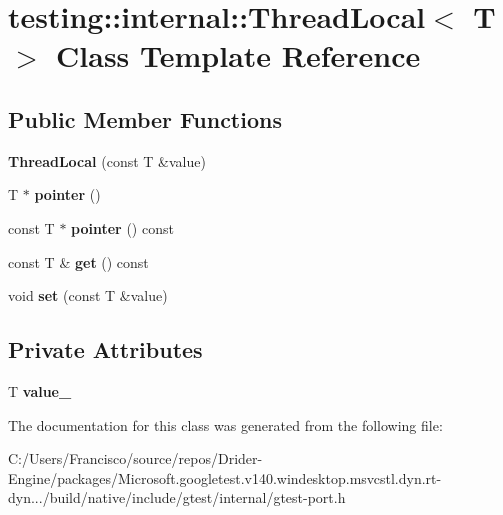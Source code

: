 \hypertarget{classtesting_1_1internal_1_1_thread_local}{}\section{testing\+:\+:internal\+:\+:Thread\+Local$<$ T $>$ Class Template Reference}
\label{classtesting_1_1internal_1_1_thread_local}
\subsection*{Public Member Functions}
\begin{DoxyCompactItemize}
\item 
\mbox{\label{classtesting_1_1internal_1_1_thread_local_a85610bdfdbc93a4c56215e0aad7da870}} 
{\bfseries Thread\+Local} (const T \&value)
\item 
\mbox{\label{classtesting_1_1internal_1_1_thread_local_a882f57fed4b074de83693c0c0fe62858}} 
T $\ast$ {\bfseries pointer} ()
\item 
\mbox{\label{classtesting_1_1internal_1_1_thread_local_a57e45bb60e3cd94abb04fa449e9f0367}} 
const T $\ast$ {\bfseries pointer} () const
\item 
\mbox{\label{classtesting_1_1internal_1_1_thread_local_ac56aeb97991824979bf192c63d1466f8}} 
const T \& {\bfseries get} () const
\item 
\mbox{\label{classtesting_1_1internal_1_1_thread_local_ab5ebc7ba07426cef7167afa2a7707eb4}} 
void {\bfseries set} (const T \&value)
\end{DoxyCompactItemize}
\subsection*{Private Attributes}
\begin{DoxyCompactItemize}
\item 
\mbox{\label{classtesting_1_1internal_1_1_thread_local_ae0db6b57bdb752feb343ee4d935708e2}} 
T {\bfseries value\+\_\+}
\end{DoxyCompactItemize}


The documentation for this class was generated from the following file\+:\begin{DoxyCompactItemize}
\item 
C\+:/\+Users/\+Francisco/source/repos/\+Drider-\/\+Engine/packages/\+Microsoft.\+googletest.\+v140.\+windesktop.\+msvcstl.\+dyn.\+rt-\/dyn.../build/native/include/gtest/internal/gtest-\/port.\+h\end{DoxyCompactItemize}
